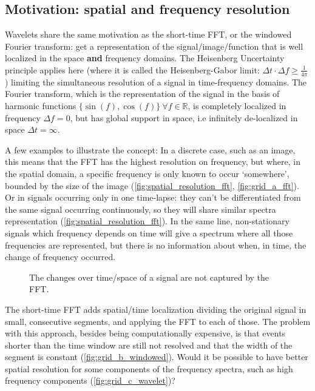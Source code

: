 \subsection{Motivation: spatial and frequency resolution}
\label{sub:Motivation}
Wavelets share the same motivation as the short-time FFT, or the windowed Fourier transform: get a representation of the signal/image/function that is well localized in the space \textbf{and} frequency domains. The Heisenberg Uncertainty principle applies here (where it is called the Heisenberg-Gabor limit: $\Delta t \cdot \Delta f \geq \frac{1}{4\pi}$) limiting the simultaneous resolution of a signal in time-frequency domains.
The Fourier transform, which is the representation of the signal in the basis of harmonic functions $\{\sin(f),\cos(f)\}\ \forall f \in \mathbb{R}$, is completely localized in frequency $\Delta f = 0$, but has global support in space, i.e infinitely de-localized in space $\Delta t = \infty$.

A few examples to illustrate the concept: In a discrete case, such as an image, this means that the FFT has the highest resolution on frequency, but where, in the spatial domain, a specific frequency is only known to occur `somewhere', bounded by the size of the image (\autoref{fig:spatial_resolution_fft}, \ref{fig:grid_a_fft}).
Or in signals occurring only in one time-lapse: they can't be differentiated from the same signal occurring continuously, so they will share similar spectra representation (\autoref{fig:spatial_resolution_fft}). In the same line, non-stationary signals which frequency depends on time will give a spectrum where all those frequencies are represented, but there is no information about when, in time, the change of frequency occurred.
\begin{figure}[H]
  \centering
  \resizebox{0.9\textwidth}{!}{}
  \caption{The changes over time/space of a signal are not captured by the FFT.}
  \label{fig:spatial_resolution_fft}
\end{figure}

The short-time FFT adds spatial/time localization dividing the original signal in small, consecutive segments, and applying the FFT to each of those. The problem with this approach, besides being computationally expensive, is that events shorter than the time window are still not resolved and that the width of the segment is constant (\autoref{fig:grid_b_windowed}). Would it be possible to have better spatial resolution for some components of the frequency spectra, such as high frequency components (\autoref{fig:grid_c_wavelet})?

